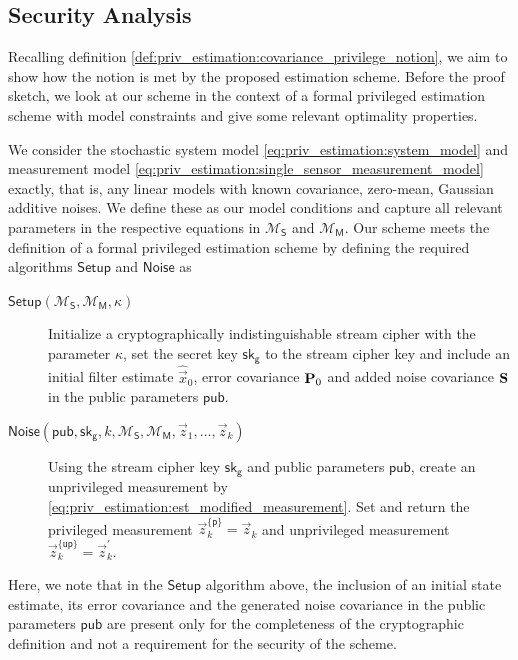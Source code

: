 % 
% 

\subsection{Security Analysis}\label{subsec:priv_estimation:est_security}
Recalling definition \ref{def:priv_estimation:covariance_privilege_notion}, we aim to show how the notion is met by the proposed estimation scheme. Before the proof sketch, we look at our scheme in the context of a formal privileged estimation scheme with model constraints and give some relevant optimality properties.

We consider the stochastic system model \eqref{eq:priv_estimation:system_model} and measurement model \eqref{eq:priv_estimation:single_sensor_measurement_model} exactly, that is, any linear models with known covariance, zero-mean, Gaussian additive noises. We define these as our model conditions and capture all relevant parameters in the respective equations in $\mathcal{M}_{\mathsf{S}}$ and $\mathcal{M}_{\mathsf{M}}$. Our scheme meets the definition of a formal privileged estimation scheme by defining the required algorithms $\mathsf{Setup}$ and $\mathsf{Noise}$ as
\begin{description}
    \item[$\mathsf{Setup}(\mathcal{M}_{\mathsf{S}}, \mathcal{M}_{\mathsf{M}}, \kappa)$] Initialize a cryptographically indistinguishable stream cipher with the parameter $\kappa$, set the secret key $\mathsf{sk}_{\mathsf{g}}$ to the stream cipher key and include an initial filter estimate $\hat{\vec{x}}_0$, error covariance ${{\mathbf{P}}}_0$ and added noise covariance ${{\mathbf{S}}}$ in the public parameters $\mathsf{pub}$.
    \item[$\mathsf{Noise}(\mathsf{pub}, \mathsf{sk}_{\mathsf{g}}, k, \mathcal{M}_{\mathsf{S}}, \mathcal{M}_{\mathsf{M}}, \vec{z}_1, \dots, \vec{z}_k)$] Using the stream cipher key $\mathsf{sk}_{\mathsf{g}}$ and public parameters $\mathsf{pub}$, create an unprivileged measurement by \eqref{eq:priv_estimation:est_modified_measurement}. Set and return the privileged measurement $\vec{z}^{\{\mathsf{p}\}}_k=\vec{z}_k$ and unprivileged measurement $\vec{z}^{\{\mathsf{up}\}}_k=\vec{z}^\prime_k$.
\end{description}
Here, we note that in the $\mathsf{Setup}$ algorithm above, the inclusion of an initial state estimate, its error covariance and the generated noise covariance in the public parameters $\mathsf{pub}$ are present only for the completeness of the cryptographic definition and not a requirement for the security of the scheme.

